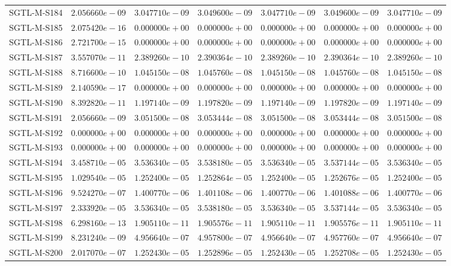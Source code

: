 \begin{longtable}{lrrrrrr}
SGTL-M-S184 & $2.056660e-09$ & $3.047710e-09$ & $3.049600e-09$ & $3.047710e-09$ & $3.049600e-09$ & $3.047710e-09$ \\
SGTL-M-S185 & $2.075420e-16$ & $0.000000e+00$ & $0.000000e+00$ & $0.000000e+00$ & $0.000000e+00$ & $0.000000e+00$ \\
SGTL-M-S186 & $2.721700e-15$ & $0.000000e+00$ & $0.000000e+00$ & $0.000000e+00$ & $0.000000e+00$ & $0.000000e+00$ \\
SGTL-M-S187 & $3.557070e-11$ & $2.389260e-10$ & $2.390364e-10$ & $2.389260e-10$ & $2.390364e-10$ & $2.389260e-10$ \\
SGTL-M-S188 & $8.716600e-10$ & $1.045150e-08$ & $1.045760e-08$ & $1.045150e-08$ & $1.045760e-08$ & $1.045150e-08$ \\
SGTL-M-S189 & $2.140590e-17$ & $0.000000e+00$ & $0.000000e+00$ & $0.000000e+00$ & $0.000000e+00$ & $0.000000e+00$ \\
SGTL-M-S190 & $8.392820e-11$ & $1.197140e-09$ & $1.197820e-09$ & $1.197140e-09$ & $1.197820e-09$ & $1.197140e-09$ \\
SGTL-M-S191 & $2.056660e-09$ & $3.051500e-08$ & $3.053444e-08$ & $3.051500e-08$ & $3.053444e-08$ & $3.051500e-08$ \\
SGTL-M-S192 & $0.000000e+00$ & $0.000000e+00$ & $0.000000e+00$ & $0.000000e+00$ & $0.000000e+00$ & $0.000000e+00$ \\
SGTL-M-S193 & $0.000000e+00$ & $0.000000e+00$ & $0.000000e+00$ & $0.000000e+00$ & $0.000000e+00$ & $0.000000e+00$ \\
SGTL-M-S194 & $3.458710e-05$ & $3.536340e-05$ & $3.538180e-05$ & $3.536340e-05$ & $3.537144e-05$ & $3.536340e-05$ \\
SGTL-M-S195 & $1.029540e-05$ & $1.252400e-05$ & $1.252864e-05$ & $1.252400e-05$ & $1.252676e-05$ & $1.252400e-05$ \\
SGTL-M-S196 & $9.524270e-07$ & $1.400770e-06$ & $1.401108e-06$ & $1.400770e-06$ & $1.401088e-06$ & $1.400770e-06$ \\
SGTL-M-S197 & $2.333920e-05$ & $3.536340e-05$ & $3.538180e-05$ & $3.536340e-05$ & $3.537144e-05$ & $3.536340e-05$ \\
SGTL-M-S198 & $6.298160e-13$ & $1.905110e-11$ & $1.905576e-11$ & $1.905110e-11$ & $1.905576e-11$ & $1.905110e-11$ \\
SGTL-M-S199 & $8.231240e-09$ & $4.956640e-07$ & $4.957800e-07$ & $4.956640e-07$ & $4.957760e-07$ & $4.956640e-07$ \\
SGTL-M-S200 & $2.017070e-07$ & $1.252430e-05$ & $1.252896e-05$ & $1.252430e-05$ & $1.252708e-05$ & $1.252430e-05$ \\

\end{longtable}
